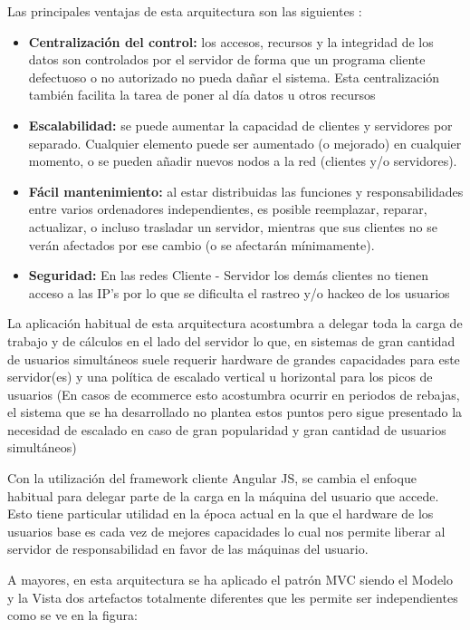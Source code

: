 \documentclass[12pt, a4paper, twoside]{book}
\begin{document}
	Las principales ventajas de esta arquitectura son las siguientes : 
	\begin{itemize}
		\item \textbf{Centralización del control:} los accesos, recursos y la integridad de los datos son controlados por el servidor de forma que un programa cliente defectuoso o no autorizado no pueda dañar el sistema. Esta centralización también facilita la tarea de poner al día datos u otros recursos
		\item \textbf{Escalabilidad:} se puede aumentar la capacidad de clientes y servidores por separado. Cualquier elemento puede ser aumentado (o mejorado) en cualquier momento, o se pueden añadir nuevos nodos a la red (clientes y/o servidores).
		\item \textbf{Fácil mantenimiento:} al estar distribuidas las funciones y responsabilidades entre varios ordenadores independientes, es posible reemplazar, reparar, actualizar, o incluso trasladar un servidor, mientras que sus clientes no se verán afectados por ese cambio (o se afectarán mínimamente).
		\item \textbf{Seguridad:} En las redes Cliente - Servidor los demás clientes no tienen acceso a las IP's por lo que se dificulta el rastreo y/o hackeo de los usuarios
	\end{itemize}
	
	La aplicación habitual de esta arquitectura acostumbra a delegar toda la carga de trabajo y de cálculos en el lado del servidor lo que, en sistemas de gran cantidad de usuarios simultáneos suele requerir hardware de grandes capacidades para este servidor(es) y una política de escalado vertical u horizontal para los picos de usuarios (En casos de ecommerce esto acostumbra ocurrir en periodos de rebajas, el sistema que se ha desarrollado no plantea estos puntos pero sigue presentado la necesidad de escalado en caso de gran popularidad y gran cantidad de usuarios simultáneos)
	
	Con la utilización del framework cliente Angular JS, se cambia el enfoque habitual para delegar parte de la carga en la máquina del usuario que accede. Esto tiene particular utilidad en la época actual en la que el hardware de los usuarios base es cada vez de mejores capacidades lo cual nos permite liberar al servidor de responsabilidad en favor de las máquinas del usuario. 
	
	A mayores, en esta arquitectura se ha aplicado el patrón MVC siendo el Modelo y la Vista dos artefactos totalmente diferentes que les permite ser independientes como se ve en la figura:
	
\end{document}
